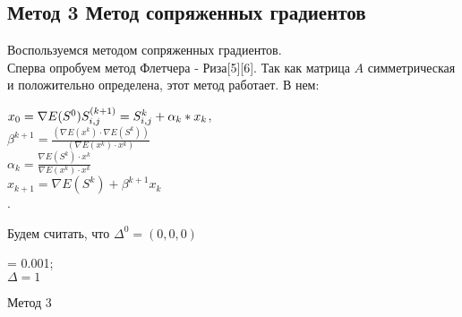 \documentclass[ 12pt,x11names]{article}
\begin{document}
    \subsection{Метод 3 Метод сопряженных градиентов}
    Воспользуемся методом сопряженных градиентов.\\
    Сперва опробуем метод Флетчера - Риза[5][6].
    Так как матрица $A$ симметрическая и положительно определена, этот метод работает.
    В нем:
    \begin{center}
    $ x_0= \nabla E(S^0)\\
    S^{(k + 1)}_{i, j} = S^{k}_{i, j} + \alpha_k * x_k $,\\
     $\beta ^{k +1} = \frac{ (\nabla E(x^k) \cdot \nabla E(S^k))} { (\nabla E(x^k) \cdot x^k)}$\\
    $\alpha_k =\frac{\nabla E(S^k) \cdot x^k}{\nabla E(x^k) \cdot x^k}$\\
    $x_{k + 1}= \nabla E(S^k) + \beta ^ {k + 1} x_k$\\
   .
    \end{center}
    Будем считать, что $\Delta^0=(0,0,0)$\\

    \begin{algorithm}[H]
		\SetAlgoLined
		\alpha = 0.001;\\
		$ \Delta  = 1$\\
	\caption{Метод 3}
    \end{algorithm}
\end{document}
